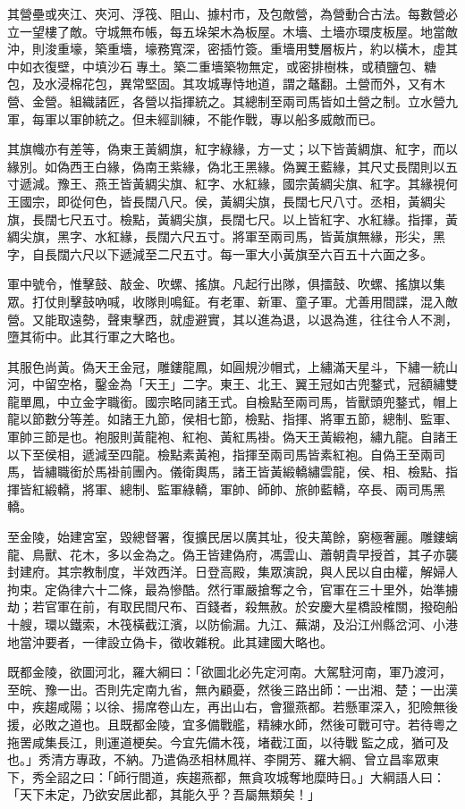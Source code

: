 \begin{pinyinscope}
其營壘或夾江、夾河、浮筏、阻山、據村市，及包敵營，為營動合古法。每數營必立一望樓了敵。守城無布帳，每五垛架木為板屋。木墻、土墻亦環庋板屋。地當敵沖，則浚重壕，築重墻，壕務寬深，密插竹簽。重墻用雙層板片，約以橫木，虛其中如衣復壁，中填沙石專土。築二重墻築物無定，或密排樹株，或積鹽包、糖包，及水浸棉花包，異常堅固。其攻城專恃地道，謂之鼇翻。土營而外，又有木營、金營。組織諸匠，各營以指揮統之。其總制至兩司馬皆如土營之制。立水營九軍，每軍以軍帥統之。但未經訓練，不能作戰，專以船多威敵而已。

其旗幟亦有差等，偽東王黃綢旗，紅字綠緣，方一丈；以下皆黃綢旗、紅字，而以緣別。如偽西王白緣，偽南王紫緣，偽北王黑緣。偽翼王藍緣，其尺丈長闊則以五寸遞減。豫王、燕王皆黃綢尖旗、紅字、水紅緣，國宗黃綢尖旗、紅字。其緣視何王國宗，即從何色，皆長闊八尺。侯，黃綢尖旗，長闊七尺八寸。丞相，黃綢尖旗，長闊七尺五寸。檢點，黃綢尖旗，長闊七尺。以上皆紅字、水紅緣。指揮，黃綢尖旗，黑字、水紅緣，長闊六尺五寸。將軍至兩司馬，皆黃旗無緣，形尖，黑字，自長闊六尺以下遞減至二尺五寸。每一軍大小黃旗至六百五十六面之多。

軍中號令，惟擊鼓、敲金、吹螺、搖旗。凡起行出隊，俱擂鼓、吹螺、搖旗以集眾。打仗則擊鼓吶喊，收隊則鳴鉦。有老軍、新軍、童子軍。尤善用間諜，混入敵營。又能取遠勢，聲東擊西，就虛避實，其以進為退，以退為進，往往令人不測，墮其術中。此其行軍之大略也。

其服色尚黃。偽天王金冠，雕鏤龍鳳，如圓規沙帽式，上繡滿天星斗，下繡一統山河，中留空格，鑿金為「天王」二字。東王、北王、翼王冠如古兜鍪式，冠額繡雙龍單鳳，中立金字職銜。國宗略同諸王式。自檢點至兩司馬，皆獸頭兜鍪式，帽上龍以節數分等差。如諸王九節，侯相七節，檢點、指揮、將軍五節，總制、監軍、軍帥三節是也。袍服則黃龍袍、紅袍、黃紅馬褂。偽天王黃緞袍，繡九龍。自諸王以下至侯相，遞減至四龍。檢點素黃袍，指揮至兩司馬皆素紅袍。自偽王至兩司馬，皆繡職銜於馬褂前團內。儀衛輿馬，諸王皆黃緞轎繡雲龍，侯、相、檢點、指揮皆紅緞轎，將軍、總制、監軍綠轎，軍帥、師帥、旅帥藍轎，卒長、兩司馬黑轎。

至金陵，始建宮室，毀總督署，復擴民居以廣其址，役夫萬餘，窮極奢麗。雕鏤螭龍、鳥獸、花木，多以金為之。偽王皆建偽府，馮雲山、蕭朝貴早授首，其子亦襲封建府。其宗教制度，半效西洋。日登高殿，集眾演說，與人民以自由權，解婦人拘束。定偽律六十二條，最為慘酷。然行軍嚴搶奪之令，官軍在三十里外，始準擄劫；若官軍在前，有取民間尺布、百錢者，殺無赦。於安慶大星橋設榷關，撥砲船十艘，環以鐵索，木筏橫截江濱，以防偷漏。九江、蕪湖，及沿江州縣岔河、小港地當沖要者，一律設立偽卡，徵收雜稅。此其建國大略也。

既都金陵，欲圖河北，羅大綱曰：「欲圖北必先定河南。大駕駐河南，軍乃渡河，至皖、豫一出。否則先定南九省，無內顧憂，然後三路出師：一出湘、楚；一出漢中，疾趨咸陽；以徐、揚席卷山左，再出山右，會獵燕都。若懸軍深入，犯險無後援，必敗之道也。且既都金陵，宜多備戰艦，精練水師，然後可戰可守。若待粵之拖罟咸集長江，則運道梗矣。今宜先備木筏，堵截江面，以待戰監之成，猶可及也。」秀清方專政，不納。乃遣偽丞相林鳳祥、李開芳、羅大綱、曾立昌率眾東下，秀全詔之曰：「師行間道，疾趨燕都，無貪攻城奪地糜時日。」大綱語人曰：「天下未定，乃欲安居此都，其能久乎？吾屬無類矣！」


\end{pinyinscope}
